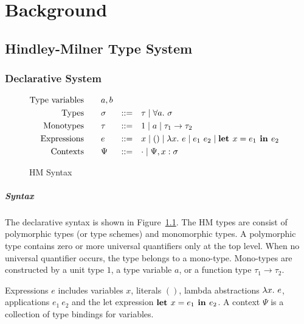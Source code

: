 \chapter{Background}
\label{chap:Background}


\section{Hindley-Milner Type System}

\subsection{Declarative System}

\begin{figure}[t]
    \begin{gather*}
    \begin{aligned}
        \text{Type variables}\qquad&a, b\\
        \text{Types}\qquad&\sigma &::=&\quad \tau \mid \all \sigma\\
        \text{Monotypes}\qquad&\tau &::=&\quad 1 \mid a \mid \tau_1\to \tau_2\\
        \text{Expressions}\qquad&e &::=&\quad x \mid () \mid \lam e \mid e_1~e_2 \mid \letin{e_1}{e_2}\\
        \text{Contexts}\qquad&\Psi &::=&\quad \cdot \mid \Psi, x:\sigma
    \end{aligned}
    \end{gather*}
\caption{HM Syntax}\label{fig:hm_decl_syntax}
\end{figure}

\paragraph{Syntax}
The declarative syntax is shown in Figure~\ref{fig:hm_decl_syntax}.
The HM types are consist of polymorphic types (or type schemes) and monomorphic types.
A polymorphic type contains zero or more universal quantifiers only at the top level.
When no universal quantifier occurs, the type belongs to a mono-type.
Mono-types are constructed by a unit type $1$, a type variable $a$,
or a function type $\tau_1 \to \tau_2$.

Expressions $e$ includes variables $x$, literals $()$, lambda abstractions $\lam e$,
applications $e_1~e_2$ and the let expression $\textbf{let } x={e_1} \textbf{ in } {e_2}$.
A context $\Psi$ is a collection of type bindings for variables.

